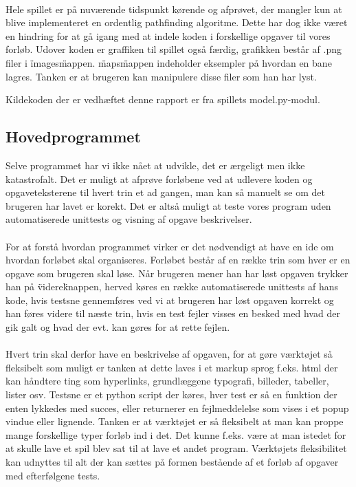 \documentclass[10pt,a4paper,danish]{article}
\begin{document}
\paragraph{}
Hele spillet er på nuværende tidspunkt kørende og afprøvet, der mangler kun at blive implementeret en ordentlig pathfinding algoritme. Dette har dog ikke været en hindring for at gå igang med at indele koden i forskellige opgaver til vores forløb.
Udover koden er graffiken til spillet også færdig, grafikken består af .png filer i \"images\" mappen.  \"maps\" mappen indeholder eksempler på hvordan en bane lagres.
Tanken er at brugeren kan manipulere disse filer som han har lyst.

Kildekoden der er vedhæftet denne rapport er fra spillets model.py-modul.



\subsection{Hovedprogrammet}

Selve programmet har vi ikke nået at udvikle, det er ærgeligt men ikke katastrofalt. Det er muligt at afprøve forløbene ved at udlevere koden og opgaveteksterene til hvert trin et ad gangen, man kan så manuelt se om det brugeren har lavet er korekt. Det er altså muligt at teste vores program uden automatiserede unittests og visning af opgave beskrivelser.

\paragraph{}
For at forstå hvordan programmet virker er det nødvendigt at have en ide om hvordan forløbet skal organiseres.
Forløbet består af en række trin som hver er en opgave som brugeren skal løse. Når brugeren mener han har løst opgaven trykker han på \"videre\" knappen, herved køres en række automatiserede unittests af hans kode, hvis testsne gennemføres ved vi at brugeren har løst opgaven korrekt og han føres videre til næste trin, hvis en test fejler visses en besked med hvad der gik galt og hvad der evt. kan gøres for at rette fejlen.

\paragraph{}
Hvert trin skal derfor have en beskrivelse af opgaven, for at gøre værktøjet så fleksibelt som muligt er tanken at dette laves i et markup sprog f.eks. html der kan håndtere ting som hyperlinks, grundlæggene typografi, billeder, tabeller, lister osv. Testsne er et python script der køres, hver test er så en funktion der enten lykkedes med succes, eller returnerer en fejlmeddelelse som vises i et popup vindue eller lignende. Tanken er at værktøjet er så fleksibelt at man kan proppe mange forskellige typer forløb ind i det. Det kunne f.eks. være at man istedet for at skulle lave et spil blev sat til at lave et andet program. Værktøjets fleksibilitet kan udnyttes til alt der kan sættes på formen bestående af et forløb af opgaver med efterfølgene tests.
\end{document}
